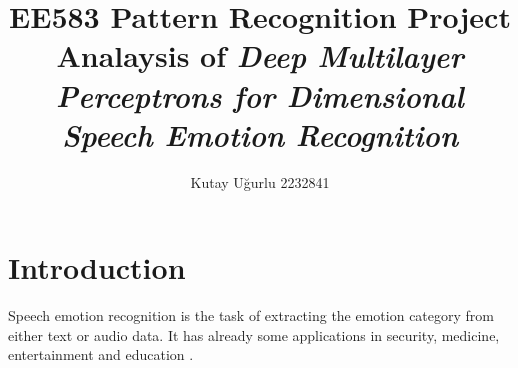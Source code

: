 \documentclass[a4paper,11pt]{article}
\author{Kutay U\u{g}urlu 2232841}
\begin{document}
    

\fancyfoot[C]{\thepage}

\title{\LARGE \LARGE EE583 Pattern Recognition Project \\ 
Analaysis of \textit{Deep Multilayer Perceptrons for Dimensional Speech Emotion Recognition}}

\maketitle{\LARGE}
\pagebreak
\tableofcontents
\listoffigures
\listoftables
\pagebreak

\section{Introduction}

Speech emotion recognition is the task of extracting the emotion category from either text or audio data. It has already some applications in security, medicine, entertainment and education \cite{cen2016real}. 
\end{document}

